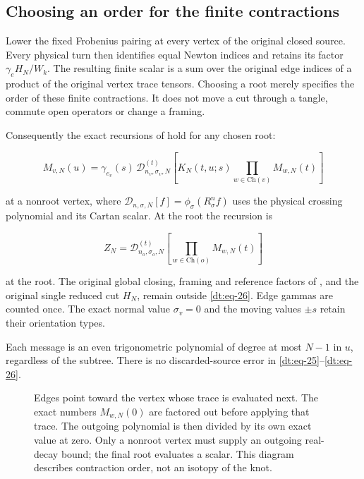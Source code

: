 \subsection{Choosing an order for the finite contractions}\label{dt:sec-3}

Lower the fixed Frobenius pairing at every vertex of the original closed
source. Every physical turn then identifies equal Newton indices and
retains its factor \(\gamma_e H_N/W_k\). The resulting finite scalar is a
sum over the original edge indices of a product of the original vertex
trace tensors. Choosing a root merely specifies the order of these
finite contractions. It does not move a cut through a tangle, commute
open operators or change a framing.

Consequently the exact recursions of \cite[Theorem~7.1]{Meridian} hold for any chosen root:

\begin{equation}\label{dt:eq-25}
M_{v,N}(u)=\gamma_{e_v}(s)\,
 \mathcal D_{n_v,\sigma_v,N}^{(t)}
 \left[K_N(t,u;s)\prod_{w\in\mathrm{Ch}(v)}M_{w,N}(t)\right]
\end{equation}

at a nonroot vertex, where
\(\mathcal D_{n,\sigma,N}[f]=\phi_\sigma(R_\sigma^n f)\)
uses the physical crossing polynomial and its Cartan scalar.
At the root the recursion is

\begin{equation}\label{dt:eq-26}
Z_N=\mathcal D_{n_o,\sigma_o,N}^{(t)}
                  \left[\prod_{w\in\mathrm{Ch}(o)}M_{w,N}(t)\right]
\end{equation}

at the root. The original global closing, framing and reference factors of \cite[Proposition~8.1]{Meridian},
and the original single reduced cut \(H_N\), remain outside \eqref{dt:eq-26}. Edge
gammas are counted once. The exact normal value \(\sigma_v=0\) and the moving
values \(\pm s\) retain their orientation types.

Each message is an even trigonometric polynomial of degree at most \(N-1\)
in \(u\), regardless of the subtree. There is no discarded-source error in
\eqref{dt:eq-25}--\eqref{dt:eq-26}.

\begin{figure}[t]
\centering
\caption{Edges point toward the vertex whose trace is evaluated next.
The exact numbers \(M_{w,N}(0)\) are factored out before applying that
trace. The outgoing polynomial is then divided by its own exact value
at zero. Only a nonroot vertex must supply an outgoing real-decay bound;
the final root evaluates a scalar. This diagram describes contraction
order, not an isotopy of the knot.}\label{dt:recursion-figure}
\end{figure}

